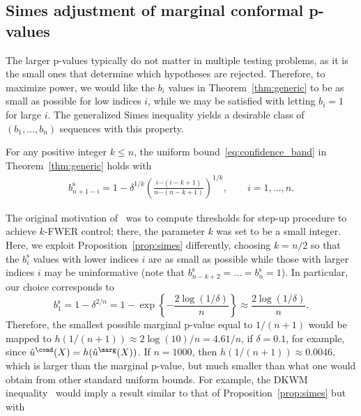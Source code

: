 \subsection{Simes adjustment of marginal conformal p-values} \label{sec:gen-simes}

The larger p-values typically do not matter in multiple testing problems, as it is the small ones that determine which hypotheses are rejected.
Therefore, to maximize power, we would like the $b_i$ values in Theorem~\ref{thm:generic} to be as small as possible for low indices $i$, while we may be satisfied with letting $b_{i} = 1$ for large $i$.
The generalized Simes inequality yields a desirable class of $(b_1, \ldots, b_n)$ sequences with this property.

\begin{prop}\label{prop:simes}
For any positive integer $k\le n$, the uniform bound~\eqref{eq:confidence_band} in Theorem~\ref{thm:generic} holds with
\begin{align} \label{eq:simes-sequence}
b^{\mathrm{s}}_{n + 1 - i} = 1 - \delta^{1/k}\left(\frac{i\cdots (i - k + 1)}{n\cdots (n - k + 1)}\right)^{1/k}, \qquad i = 1, \ldots, n.
\end{align}
\end{prop}
The original motivation of~\cite{sarkar2008generalizing} was to compute thresholds for step-up procedure to achieve $k$-FWER control; there, the parameter $k$ was set to be a small integer.
Here, we exploit Proposition~\ref{prop:simes} differently, choosing {$k = n / 2$} so that the $b^{\mathrm{s}}_{i}$ values {with} lower indices $i$ are as small as possible while those {with larger indices} $i$ may be uninformative (note that $b^{\mathrm{s}}_{n - k + 2} = \ldots = b^{\mathrm{s}}_{n} = 1$).
In particular, our choice corresponds to
\begin{equation*}
{b^{\mathrm{s}}_{1} = 1 - \delta^{2/n} = 1 - \exp\left\{-\frac{2\log(1 / \delta)}{n}\right\} \approx \frac{2\log(1 / \delta)}{n}.}
\end{equation*}
Therefore, the smallest possible marginal p-value equal to $1/(n+1)$ would be mapped to $h(1 / (n + 1)) \approx 2\log(10) / n = 4.61 / n$, if $\delta = 0.1$, for example, since $\hat{u}^\cond(X) = h(\hat{u}^\marg(X))$.
If $n = 1000$, then $h(1 / (n + 1)) \approx 0.0046$, which is larger than the marginal p-value, but much smaller than what one would obtain from other standard uniform bounds. For example, the DKWM inequality~\citep{dvoretzky1956asymptotic, massart1990tight} would imply a result similar to that of Proposition~\ref{prop:simes} but with
